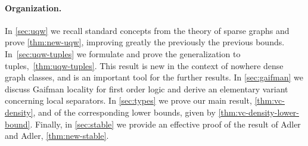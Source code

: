 %
%
%
%


\paragraph{Organization.} In \cref{sec:uqw} we recall standard concepts from the theory of sparse graphs and prove \cref{thm:new-uqw}, improving greatly the previously the previous bounds.
In~\cref{sec:uqw-tuples} we formulate and prove the  generalization to tuples,~\cref{thm:uqw-tuples}. This result is new in the context of nowhere dense graph classes, and is an important tool for the further results.
In \cref{sec:gaifman} we discuss Gaifman locality for first order logic and derive an elementary variant  concerning local separators.
 In \cref{sec:types} we prove our main result, \cref{thm:vc-density}, and of the corresponding lower bounds, given by \cref{thm:vc-density-lower-bound}.
Finally, in \cref{sec:stable} we provide an effective proof of the result of Adler and Adler, \cref{thm:new-stable}.

